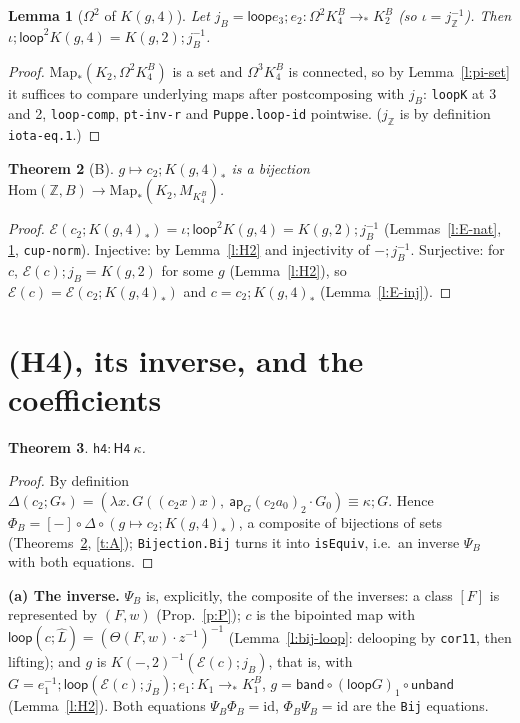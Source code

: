 \documentclass[11pt]{amsart}
\newtheorem{theorem}{Theorem}
\newtheorem{lemma}[theorem]{Lemma}
\theoremstyle{definition}
\theoremstyle{remark}
\newcommand{\Om}{\Omega}
\newcommand{\Map}{\mathrm{Map}_*}
\newcommand{\Z}{\mathbb{Z}}
\newcommand{\code}[1]{\texttt{#1}}
\newcommand{\lp}{\mathsf{loop}}
\newcommand{\Hom}{\mathrm{Hom}}
\begin{document}
\begin{lemma}[$\Om^2$ of $K(g,4)$]\label{l:j}
Let $j_B=\lp e_3;e_2:\Om^2K^B_4\to_*K^B_2$ (so $\iota=j_\Z^{-1}$). Then
$\iota;\lp^2K(g,4)=K(g,2);j_B^{-1}$.
\end{lemma}
\begin{proof}
$\Map(K_2,\Om^2K^B_4)$ is a set and $\Om^3K^B_4$ is connected, so by
Lemma~\ref{l:pi-set} it suffices to compare underlying maps after
postcomposing with $j_B$: \code{loopK} at 3 and 2, \code{loop-comp},
\code{pt-inv-r} and \code{Puppe.loop-id} pointwise. ($j_\Z$ is by definition
\code{iota-eq.1}.)
\end{proof}

\begin{theorem}[B]\label{t:B}
$g\mapsto c_2;K(g,4)_*$ is a bijection $\Hom(\Z,B)\to\Map(K_2,M_{K^B_4})$.
\end{theorem}
\begin{proof}
$\mathcal E(c_2;K(g,4)_*)=\iota;\lp^2K(g,4)=K(g,2);j_B^{-1}$
(Lemmas~\ref{l:E-nat}, \ref{l:j}, \code{cup-norm}). Injective: by
Lemma~\ref{l:H2} and injectivity of $-;j_B^{-1}$. Surjective: for $c$,
$\mathcal E(c);j_B=K(g,2)$ for some $g$ (Lemma~\ref{l:H2}), so
$\mathcal E(c)=\mathcal E(c_2;K(g,4)_*)$ and $c=c_2;K(g,4)_*$
(Lemma~\ref{l:E-inj}).
\end{proof}

\section{(H4), its inverse, and the coefficients}\label{sec:H4}

\begin{theorem}\label{t:H4}
$\mathsf{h4}:\mathsf{H4}\ \kappa$.
\end{theorem}
\begin{proof}
By definition $\Delta(c_2;G_*)=(\lambda x.\,G((c_2x)x),\ \mathsf{ap}_G(c_2a_0)_2\cdot G_0)
\equiv\kappa;G$. Hence $\Phi_B=[-]\circ\Delta\circ(g\mapsto c_2;K(g,4)_*)$,
a composite of bijections of sets (Theorems~\ref{t:B}, \ref{t:A}); \code{Bijection.Bij}
turns it into \code{isEquiv}, i.e.\ an inverse $\Psi_B$ with both equations.
\end{proof}

\noindent\textbf{(a) The inverse.} $\Psi_B$ is, explicitly, the composite
of the inverses: a class $[F]$ is represented by $(F,w)$ (Prop.~\ref{p:P});
$c$ is the bipointed map with $\lp(c;\hat L)=(\Theta(F,w)\cdot z^{-1})^{-1}$
(Lemma~\ref{l:bij-loop}: delooping by \code{cor11}, then lifting); and $g$
is $K(-,2)^{-1}(\mathcal E(c);j_B)$, that is, with $G=e_1^{-1};\lp(\mathcal E(c);j_B);e_1:K_1\to_*K^B_1$,
$g=\mathsf{band}\circ(\lp G)_1\circ\mathsf{unband}$ (Lemma~\ref{l:H2}).
Both equations $\Psi_B\Phi_B=\mathrm{id}$, $\Phi_B\Psi_B=\mathrm{id}$ are the
\code{Bij} equations.
\end{document}
